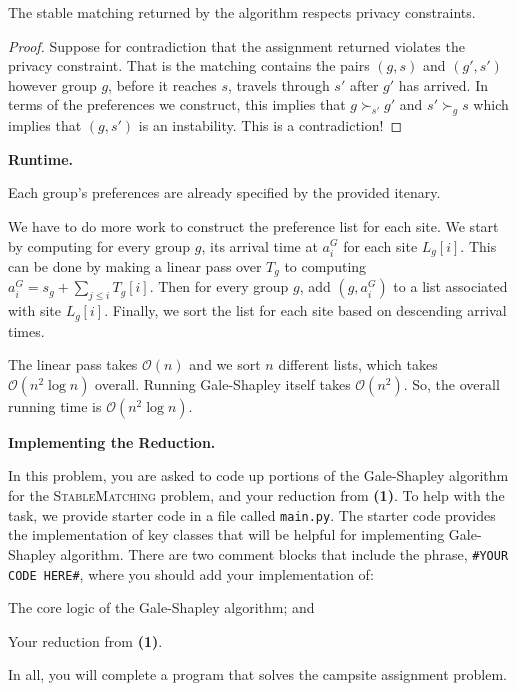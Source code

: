 \documentclass[11pt]{article}
\begin{document}
{\setcounter{section}{1}
\begin{lemma}
  The stable matching returned by the algorithm respects privacy constraints.
\end{lemma}
\begin{proof}
  Suppose for contradiction that the assignment returned violates the privacy constraint. That is the matching contains the pairs $(g, s)$ and $(g', s')$ however group $g$, before it reaches $s$, travels through $s'$ after $g'$ has arrived. In terms of the preferences we construct, this implies that $g \succ_{s'} g'$ and $s' \succ_{g} s$ which implies that $(g, s')$ is an instability. This is a contradiction! 
\end{proof}

\textbf{Runtime.}

Each group's preferences are already specified by the provided itenary. 

We have to do more work to construct the preference list for each site. We start by computing for every group $g$, its arrival time at $a_i^G$ for each site $L_g[i]$. This can be done by making a linear pass over $T_g$ to computing $a_i^G = s_g + \sum_{j \le i} T_g[i]$. Then for every group $g$, add $(g, a_i^G)$ to a list associated with site $L_g[i]$. Finally, we sort the list for each site based on descending arrival times. 

The linear pass takes $\mathcal{O}(n)$ and we sort $n$ different lists, which takes $\mathcal{O}(n^2 \log n)$ overall. Running Gale-Shapley itself takes $\mathcal{O}(n^2)$. So, the overall running time is $\mathcal{O}(n^2 \log n)$.
}

\clearpage















\textbf{Implementing the Reduction.}

In this problem, you are asked to code up portions of the Gale-Shapley algorithm for the \textsc{StableMatching} problem, and your reduction from \textbf{(1)}.
To help with the task, we provide starter code in a file called \texttt{main.py}.
The starter code provides the implementation of key classes that will be helpful for implementing Gale-Shapley algorithm.
There are two comment blocks that include the phrase, \texttt{\#YOUR CODE HERE\#},
where you should add your implementation of:
\begin{compactitem}
    \item The core logic of the Gale-Shapley algorithm; and
    \item Your reduction from \textbf{(1)}.
\end{compactitem}
In all, you will complete a program that solves the campsite assignment problem.
\end{document}
